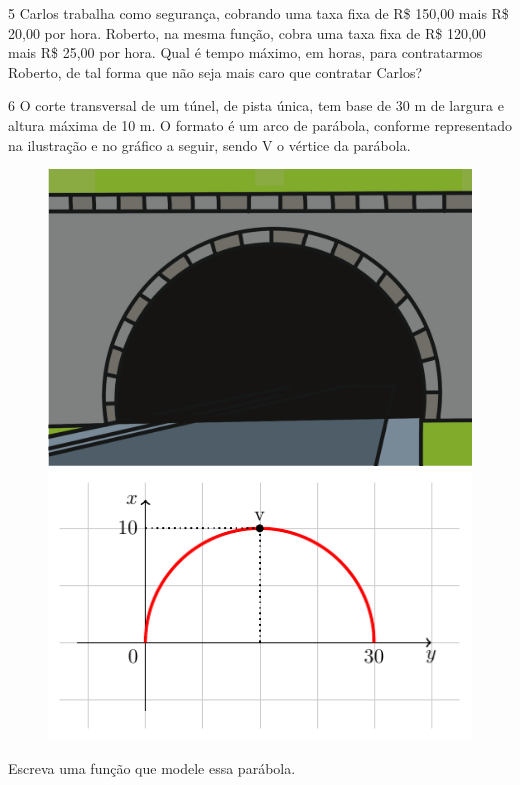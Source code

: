 \pagebreak
\num{5} Carlos trabalha como segurança, cobrando uma taxa fixa de R\$ 150,00 mais
R\$ 20,00 por hora. Roberto, na mesma função, cobra uma taxa fixa de R\$ 120,00
mais R\$ 25,00 por hora. Qual é tempo máximo, em horas, para contratarmos Roberto,
de tal forma que não seja mais caro que contratar Carlos?

\begin{emptybox}

\end{emptybox}

\num{6} O corte transversal de um túnel, de pista única, tem base de 30 m de largura
e altura máxima de 10 m. O formato é um arco de parábola, conforme representado na
ilustração e no gráfico a seguir, sendo V o vértice da parábola.

\begin{figure}[htpb!]
\centering
\includegraphics[width=.45\textwidth]{./ilustras-mat/modulo_9-atividade_6b.png}
\includegraphics[width=.45\textwidth]{./tikz/008.pdf}
\end{figure}

Escreva uma função que modele essa parábola.

\begin{emptybox}
\end{emptybox}

